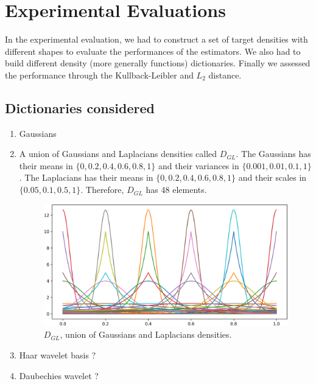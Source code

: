 \section{Experimental Evaluations}

In the experimental evaluation, we had to construct a set of target densities with different shapes to evaluate the performances of the estimators. We also had to build different density (more generally functions) dictionaries. Finally we assessed the performance through the Kullback-Leibler and $L_2$ distance.

\subsection{Dictionaries considered}
\begin{enumerate}
\item Gaussians
\item A union of Gaussians and Laplacians densities called $D_{GL}$. The Gaussians has their means in $\{0, 0.2, 0.4, 0.6, 0.8, 1\}$ and their variances in $\{0.001, 0.01, 0.1, 1\}$. The Laplacians has their means in $\{0, 0.2, 0.4, 0.6, 0.8, 1\}$ and their scales in $\{0.05, 0.1, 0.5, 1\}$. Therefore, $D_{GL}$ has 48 elements.

\begin{figure}[h]
\centering
\includegraphics[width=1\textwidth]{TeX_files/lapl_gauss_dict.png}
\caption{$D_{GL}$, union of Gaussians and Laplacians densities.}
\end{figure}
\item Haar wavelet basis ?
\item Daubechies wavelet ?
\end{enumerate}

